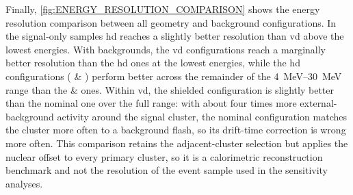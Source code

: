 Finally, \cref{fig:ENERGY_RESOLUTION_COMPARISON} shows the energy resolution comparison between all geometry and background configurations. In the signal-only samples \gls{hd} reaches a slightly better resolution than \gls{vd} above the lowest energies. With backgrounds, the \gls{vd} configurations reach a marginally better resolution than the \gls{hd} ones at the lowest energies, while the \gls{hd} configurations ( \& ) perform better across the remainder of the \qtyrange{4}{30}{\mega\electronvolt} range than the  \&  ones. Within \gls{vd}, the shielded configuration is slightly better than the nominal one over the full range: with about four times more external-background activity around the signal cluster, the nominal configuration matches the cluster more often to a background flash, so its drift-time correction is wrong more often. This comparison retains the adjacent-cluster selection but applies the nuclear offset to every primary cluster, so it is a calorimetric reconstruction benchmark and not the resolution of the event sample used in the sensitivity analyses.